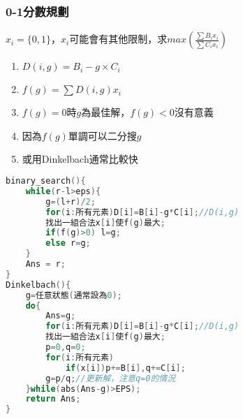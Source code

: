 \subsubsection{0-1分數規劃}
$x_i=\{0,1\}$，$x_i$可能會有其他限制，求$max\left(\frac{\sum B_ix_i}{\sum C_ix_i}\right)$
\begin{enumerate}\itemsep = -1pt
\item $D(i,g)=B_i-g\times C_i$
\item $f(g)=\sum D(i,g)x_i$
\item $f(g)=0$時$g$為最佳解，$f(g)<0$沒有意義
\item 因為$f(g)$單調可以二分搜$g$
\item 或用Dinkelbach通常比較快
\end{enumerate}
\begin{lstlisting}[language=C++]
binary_search(){
	while(r-l>eps){
		g=(l+r)/2;
		for(i:所有元素)D[i]=B[i]-g*C[i];//D(i,g) 
		找出一組合法x[i]使f(g)最大;
		if(f(g)>0) l=g;
		else r=g;
	}
	Ans = r;
}
Dinkelbach(){
	g=任意狀態(通常設為0);
	do{
		Ans=g;
		for(i:所有元素)D[i]=B[i]-g*C[i];//D(i,g) 
		找出一組合法x[i]使f(g)最大;
		p=0,q=0;
		for(i:所有元素)
			if(x[i])p+=B[i],q+=C[i];
		g=p/q;//更新解，注意q=0的情況 
	}while(abs(Ans-g)>EPS);
	return Ans;
}
\end{lstlisting}

